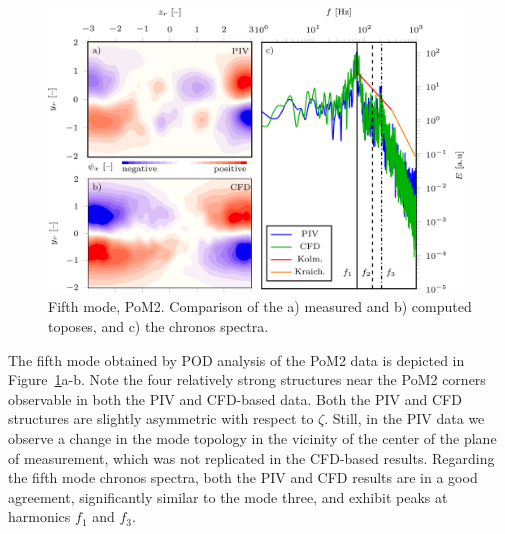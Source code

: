 {\begin{figure}[htbp]
    \centering
    \includegraphics[width=0.98\textwidth]{02_images/00_export/figure16.png}
    \caption{{Fifth mode, PoM2.} Comparison of the a) measured and b) computed toposes, and c) the chronos spectra.}
    \label{fig:pom2mod6}
\end{figure}
The {fifth} mode obtained by POD analysis of the PoM2 data is depicted in Figure~\ref{fig:pom2mod6}a-b. Note the four relatively strong structures near {the PoM2} corners {observable in both the PIV and CFD-based data}. {Both the PIV and CFD structures are slightly asymmetric with respect to $\zeta$.} {Still}, in the {PIV} data we observe {a change in the mode topology in the vicinity of the center of the plane of measurement, which was not replicated in the CFD-based results. Regarding the fifth mode chronos spectra, both the PIV and CFD results are in a good agreement, significantly similar to the mode three, and exhibit} peaks at harmonics $f_1$ and $f_3$.



}
